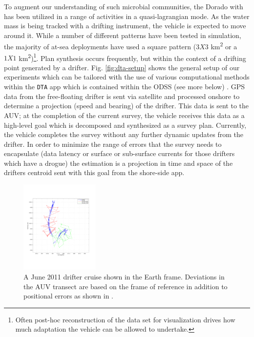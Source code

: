 To augment our understanding of such microbial communities, the Dorado
with \rx has been utilized in a range of activities in a
quasi-lagrangian mode. As the water mass is being tracked with a
drifting instrument, the vehicle is expected to move around it. While
a number of different patterns have been tested in simulation, the
majority of at-sea deployments have used a square pattern ($3X3$
km\textsuperscript{2} or a $1X1$ km\textsuperscript{2})\footnote{Often
  post-hoc reconstruction of the data set for visualization drives how
  much adaptation the vehicle can be allowed to undertake.}. Plan
synthesis occurs frequently, but within the context of a drifting
point generated by a drifter. Fig. \ref{fig:dta-setup} shows the
general setup of our experiments which can be tailored with the use of
various computational methods within the \texttt{DTA} app which is
contained within the ODSS (see more below) \cite{das11}. GPS data from
the free-floating drifter is sent via satellite and processed onshore
to determine a projection (speed and bearing) of the drifter. This
data is sent to the AUV; at the completion of the current survey, the
vehicle receives this data as a high-level goal which is decomposed
and synthesized as a survey plan. Currently, the vehicle completes the
survey without any further dynamic updates from the drifter. In order
to minimize the range of errors that the survey needs to encapsulate
(data latency or surface or sub-surface currents for those drifters
which have a drogue) the estimation is a projection in time and space
of the drifters centroid sent with this goal from the shore-side app.

\begin{figure}[htpb]
\centering
\includegraphics[width=0.35\textwidth]{figs/june11-drifter-follow-180-181.pdf}
\caption{\small{A June 2011 drifter cruise shown in the Earth
    frame. Deviations in the AUV transect are based on the frame of
    reference in addition to positional errors as shown in
    \cite{das11b}.}}
\label{fig:drifter-errors}
\end{figure}

